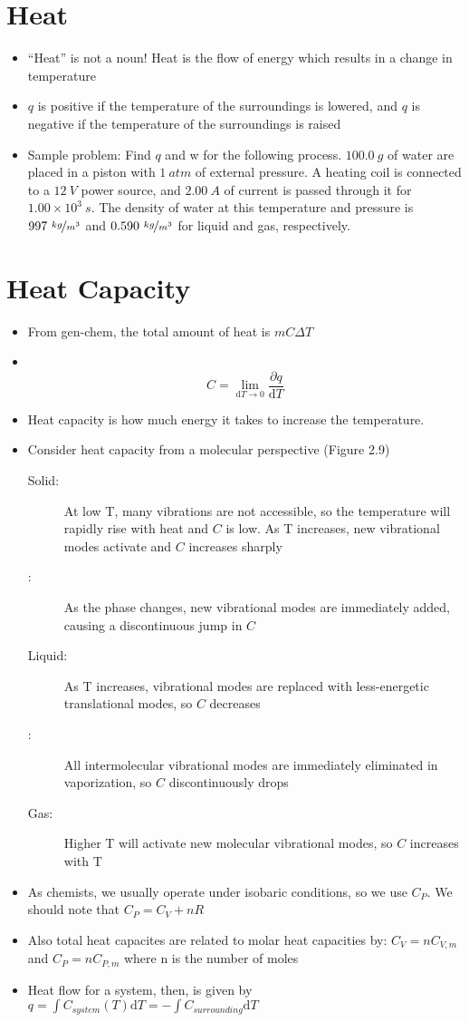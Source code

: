 \documentclass[12pt, openany, letterpaper]{memoir}
\begin{document}
\section*{Heat}
\begin{itemize}
	\item ``Heat'' is not a noun! Heat is the flow of energy which results in a change in temperature
	\item $q$ is positive if the temperature of the surroundings is lowered, and $q$ is negative if the temperature of the surroundings is raised
	\item Sample problem: Find $q$ and w for the following process. $100.0~g$ of water are placed in a piston with $1~atm$ of external pressure. A heating coil is connected to a $12~V$ power source, and $2.00~A$ of current is passed through it for $1.00\times10^3~s$. The density of water at this temperature and pressure is $997~\nicefrac{kg}{m^3}$ and $0.590~\nicefrac{kg}{m^3}$ for liquid and gas, respectively.		
\end{itemize}
\section*{Heat Capacity}
\begin{itemize}
	\item From gen-chem, the total amount of heat is $mC\Delta T$	
	\item ~
		  \vspace{-2.5em}\[C=\lim_{\mathrm{d} T \to 0}\dfrac{\partial q}{\mathrm{d} T}\]
	\item Heat capacity is how much energy it takes to increase the temperature.
	\item Consider heat capacity from a molecular perspective (Figure 2.9)
	\begin{description}
		\item[Solid:] At low T, many vibrations are not accessible, so the temperature will rapidly rise with heat and $C$ is low. As T increases, new vibrational modes activate and $C$ increases sharply
		\item[:] As the phase changes, new vibrational modes are immediately added, causing a discontinuous jump in $C$
		\item[Liquid:] As T increases, vibrational modes are replaced with less-energetic translational modes, so $C$ decreases
		\item[:] All intermolecular vibrational modes are immediately eliminated in vaporization, so $C$ discontinuously drops
		\item[Gas:] Higher T will activate new molecular vibrational modes, so $C$ increases with T
	\end{description}
	\item As chemists, we usually operate under isobaric conditions, so we use $C_P$. We should note that $C_P = C_V + nR$
	\item Also total heat capacites are related to molar heat capacities by: $C_V = nC_{V,m}$ and $C_P = nC_{P,m}$ where n is the number of moles
	\item Heat flow for a system, then, is given by $q = \int\! C_{system}(T)\mathrm{d}T = -\int\! C_{surrounding}\mathrm{d}T$
\end{itemize}
\end{document}
